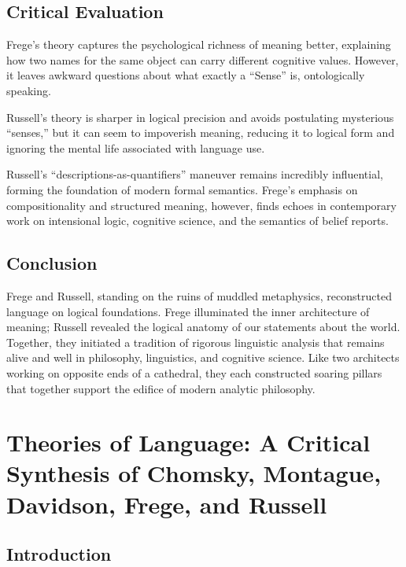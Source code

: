 \documentclass[12pt]{article}
\begin{document}
\hypertarget{critical-evaluation}{%
\subsection{Critical Evaluation}\label{critical-evaluation}}

Frege's theory captures the psychological richness of meaning better,
explaining how two names for the same object can carry different
cognitive values. However, it leaves awkward questions about what
exactly a ``Sense'' is, ontologically speaking.

Russell's theory is sharper in logical precision and avoids postulating
mysterious ``senses,'' but it can seem to impoverish meaning, reducing
it to logical form and ignoring the mental life associated with language
use.

Russell's ``descriptions-as-quantifiers'' maneuver remains incredibly
influential, forming the foundation of modern formal semantics. Frege's
emphasis on compositionality and structured meaning, however, finds
echoes in contemporary work on intensional logic, cognitive science, and
the semantics of belief reports.

\hypertarget{conclusion-4}{%
\subsection{Conclusion}\label{conclusion-4}}

Frege and Russell, standing on the ruins of muddled metaphysics,
reconstructed language on logical foundations. Frege illuminated the
inner architecture of meaning; Russell revealed the logical anatomy of
our statements about the world. Together, they initiated a tradition of
rigorous linguistic analysis that remains alive and well in philosophy,
linguistics, and cognitive science. Like two architects working on
opposite ends of a cathedral, they each constructed soaring pillars that
together support the edifice of modern analytic philosophy.

\hypertarget{theories-of-language-a-critical-synthesis-of-chomsky-montague-davidson-frege-and-russell}{%
\section{Theories of Language: A Critical Synthesis of Chomsky,
Montague, Davidson, Frege, and
Russell}\label{theories-of-language-a-critical-synthesis-of-chomsky-montague-davidson-frege-and-russell}}

\hypertarget{introduction-5}{%
\subsection{Introduction}\label{introduction-5}}
\end{document}
